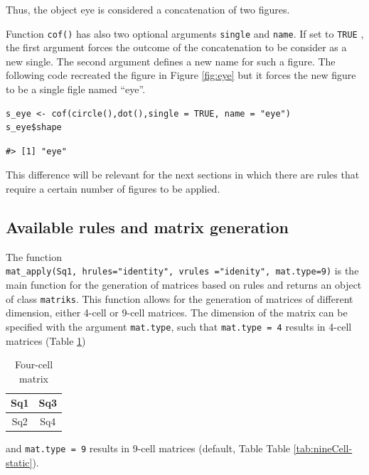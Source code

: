 Thus, the object eye is considered a concatenation of two figures.

Function \texttt{cof()} has also two optional arguments \texttt{single} and \texttt{name}. If set to \texttt{TRUE} ,
the first argument forces the outcome of the concatenation to be consider as a new single.
The second argument defines a new name for such a figure.
The following code recreated the figure in Figure \ref{fig:eye} but it forces the new figure to be a single figle named ``eye''.

\begin{verbatim}
s_eye <- cof(circle(),dot(),single = TRUE, name = "eye")
s_eye$shape
\end{verbatim}

\begin{verbatim}
#> [1] "eye"
\end{verbatim}

This difference will be relevant for the next sections in which there are rules that require a certain number of figures to be applied.

\hypertarget{available-rules-and-matrix-generation}{%
\subsection{Available rules and matrix generation}\label{available-rules-and-matrix-generation}}

The function \texttt{mat\_apply(Sq1,\ hrules="identity",\ vrules\ ="idenity",\ mat.type=9)} is the main function for the generation of matrices based on rules and returns an object of class \texttt{matriks}.
This function allows for the generation of matrices of different dimension, either 4-cell or 9-cell matrices.
The dimension of the matrix can be specified with the argument \texttt{mat.type}, such that \texttt{mat.type\ =\ 4} results in 4-cell matrices (Table \ref{tab:fourCell-static})

\begin{table}

\caption{\label{tab:fourCell-static}Four-cell matrix}
\centering
\begin{tabular}[t]{c|c}
\hline
Sq1 & Sq3\\
\hline
Sq2 & Sq4\\
\hline
\end{tabular}
\end{table}

and \texttt{mat.type\ =\ 9} results in 9-cell matrices (default, Table Table \ref{tab:nineCell-static}).

